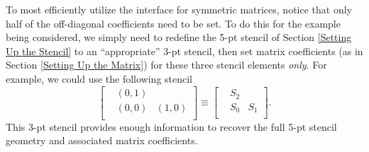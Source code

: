 To most efficiently utilize the  interface for symmetric
matrices, notice that only half of the off-diagonal coefficients need
to be set.  To do this for the example being considered, we simply
need to redefine the 5-pt stencil of Section
\ref{Setting Up the Stencil} to an ``appropriate'' 3-pt stencil, then
set matrix coefficients (as in Section \ref{Setting Up the Matrix})
for these three stencil elements {\em only}.  For example, we could
use the following stencil
\begin{equation}\label{eqn-symmetric-stencil}
\left [
\begin{array}{ccc}
 & ( 0, 1) &         \\
 & ( 0, 0) & ( 1, 0) \\
 &         &        
\end{array}
\right ]
\equiv
\left [
\begin{array}{ccc}
 & S_2 &     \\
 & S_0 & S_1 \\
 &     &    
\end{array}
\right ] .
\end{equation}
This 3-pt stencil provides enough information to recover the full 5-pt
stencil geometry and associated matrix coefficients.

